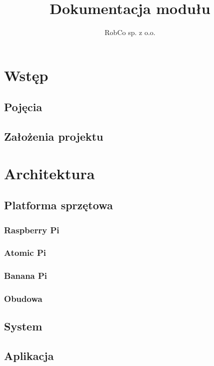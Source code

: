 \documentclass[
12pt, %
a4paper
]{report}
\title{Dokumentacja modułu}
\author{RobCo sp. z o.o.}
\newcommand\blankpage{%
    \null
    \thispagestyle{empty}%
    \addtocounter{page}{-1}%
    \newpage
}
\begin{document}
			


	

	\afterpage{\blankpage}
	
	

	\chapter{Wstęp}
        \section{Pojęcia}
		
		\section{Założenia projektu} 
		
		
    \chapter{Architektura}
    
        \section{Platforma sprzętowa}
        
            \subsection{Raspberry Pi}
            
            \subsection{Atomic Pi}
            
            \subsection{Banana Pi}
            
            \subsection{Obudowa}
            
        \section{System} 
        
        \section{Aplikacja} 
        
\end{document}
